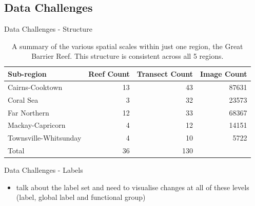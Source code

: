 \documentclass{beamer}
\begin{document}
        \subsection{Data Challenges}
            \begin{frame}{Data Challenges - Structure}
                \begin{center}
                  \begin{table}
                    \begin{tabular}{l r r r}
                      Sub-region            &   Reef Count      &   Transect Count      &   Image Count           \\ \hline
                      Cairns-Cooktown       &   13              &   43                  &   87631                 \\
                      Coral Sea             &   3               &   32                  &   23573                 \\
                      Far Northern          &   12              &   33                  &   68367                 \\
                      Mackay-Capricorn      &   4               &   12                  &   14151                 \\
                      Townsville-Whitsunday &   4               &   10                  &   5722                  \\
                      Total                 &   36              &   130                 &   {\color{red}{199444}} \\
                    \end{tabular}
                      \label{tab:GBRSummary}
                      \caption{A summary of the various spatial scales within just one region, the Great Barrier Reef. This structure is consistent across all 5 regions.}
                  \end{table}
                \end{center}
            \end{frame}

            \begin{frame}{Data Challenges - Labels}
                \begin{itemize}
                  \item talk about the label set and need to visualise changes at all of these levels (label, global label and functional group)
                \end{itemize}
            \end{frame}
\end{document}
